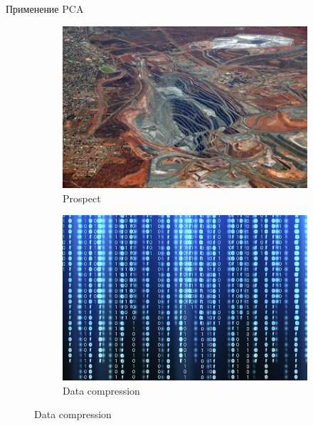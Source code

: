 \documentclass[10pt]{beamer}
\begin{document}
\begin{frame}{Применение PCA}
\begin{figure}
    \begin{subfigure}[b]{0.4\textwidth}
        \includegraphics[width=\textwidth]{images/geology.jpg}
        \caption{Prospect}
    \end{subfigure}
    \begin{subfigure}[b]{0.4\textwidth}
        \includegraphics[width=\textwidth]{images/compression.jpg}
        \caption{Data compression}
    \end{subfigure}
\end{figure}
\end{frame}
\end{document}
